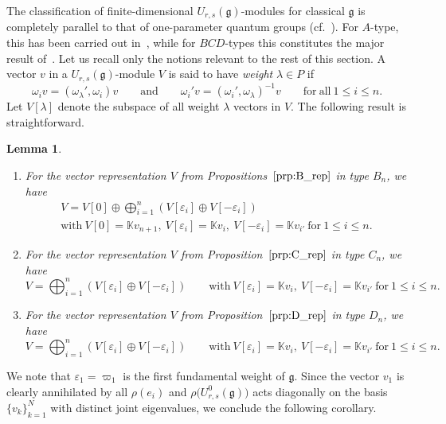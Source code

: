\documentclass[10pt,a4paper]{amsart}
\numberwithin{equation}{section}
\newtheorem{Lemma}[Theorem]{Lemma}
\newcommand{\fg}{\mathfrak{g}}
\begin{document}
The classification of finite-dimensional $U_{r,s}(\fg)$-modules for classical $\fg$ is completely parallel to that of one-parameter quantum groups (cf.\ \cite[Section~5]{J}). For $A$-type, this has been carried out in~\cite{BW2}, while for $BCD$-types this constitutes the major result of~\cite{BGH2}. Let us recall only the notions relevant to the rest of this section.
A vector $v$ in a $U_{r,s}(\mathfrak{g})$-module $V$ is said to have \textit{weight} $\lambda \in P$ if
\begin{displaymath}
 \omega_{i}v = (\omega_{\lambda}',\omega_{i})v \qquad \mathrm{and} \qquad
 \omega_{i}'v = (\omega_{i}',\omega_{\lambda})^{-1}v \qquad \mathrm{for\ all} \ 1\leq i\leq n.
\end{displaymath}
Let $V[\lambda]$ denote the subspace of all weight $\lambda$ vectors in $V$.
The following result is straightforward.


\begin{Lemma}\quad
\begin{enumerate}\itemsep=0pt
\item[$(a)$] For the vector representation $V$ from Propositions~$\ref{prp:B_rep}$ in type $B_n$, we have
\begin{gather*}
 V = V[0] \oplus \bigoplus_{i=1}^{n}(V[\varepsilon_{i}] \oplus V[-\varepsilon_{i}])\\
\mathrm{with} \
 V[0] = \mathbb{K} v_{n+1}, \ V[\varepsilon_{i}] = \mathbb{K}v_{i},\ V[-\varepsilon_{i}] = \mathbb{K}v_{i'}
 \ \text{for} \  1\leq i\leq n.
\end{gather*}

\item[$(b)$] For the vector representation $V$ from Proposition~$\ref{prp:C_rep}$ in type $C_n$, we have
\[
 V = \bigoplus_{i=1}^{n} (V[\varepsilon_{i}] \oplus V[-\varepsilon_{i}])
 \qquad \mathrm{with} \
 V[\varepsilon_{i}] = \mathbb{K}v_{i},\ V[-\varepsilon_{i}] = \mathbb{K}v_{i'} \ \mathrm{for} \ 1\leq i\leq n .
\]

\item[$(c)$] For the vector representation $V$ from Proposition~$\ref{prp:D_rep}$ in type $D_n$, we have
\[
 V = \bigoplus_{i=1}^{n} (V[\varepsilon_{i}] \oplus V[-\varepsilon_{i}])
 \qquad \mathrm{with} \
 V[\varepsilon_{i}] = \mathbb{K}v_{i},\ V[-\varepsilon_{i}] = \mathbb{K}v_{i'} \ \mathrm{for} \ 1\leq i\leq n .
\]
\end{enumerate}
\end{Lemma}


We note that $\varepsilon_1=\varpi_1$ is the first fundamental weight of $\fg$. Since the vector $v_1$ is clearly annihilated by all $\rho(e_i)$ and $\rho\bigl(U^0_{r,s}(\fg)\bigr)$ acts diagonally on the basis $\{v_k\}_{k=1}^N$ with distinct joint eigenvalues, we conclude the following corollary.
\end{document}
